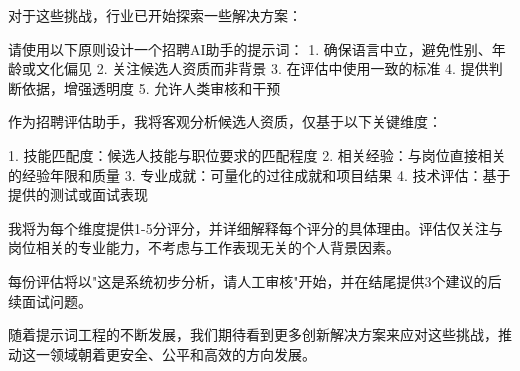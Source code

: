 \documentclass[12pt]{ctexart}
\begin{document}
对于这些挑战，行业已开始探索一些解决方案：

\begin{promptbox}
请使用以下原则设计一个招聘AI助手的提示词：
1. 确保语言中立，避免性别、年龄或文化偏见
2. 关注候选人资质而非背景
3. 在评估中使用一致的标准
4. 提供判断依据，增强透明度
5. 允许人类审核和干预
\end{promptbox}

\begin{outputbox}
作为招聘评估助手，我将客观分析候选人资质，仅基于以下关键维度：

1. 技能匹配度：候选人技能与职位要求的匹配程度
2. 相关经验：与岗位直接相关的经验年限和质量
3. 专业成就：可量化的过往成就和项目结果
4. 技术评估：基于提供的测试或面试表现

我将为每个维度提供1-5分评分，并详细解释每个评分的具体理由。评估仅关注与岗位相关的专业能力，不考虑与工作表现无关的个人背景因素。

每份评估将以"这是系统初步分析，请人工审核"开始，并在结尾提供3个建议的后续面试问题。
\end{outputbox}

随着提示词工程的不断发展，我们期待看到更多创新解决方案来应对这些挑战，推动这一领域朝着更安全、公平和高效的方向发展。
\end{document}
